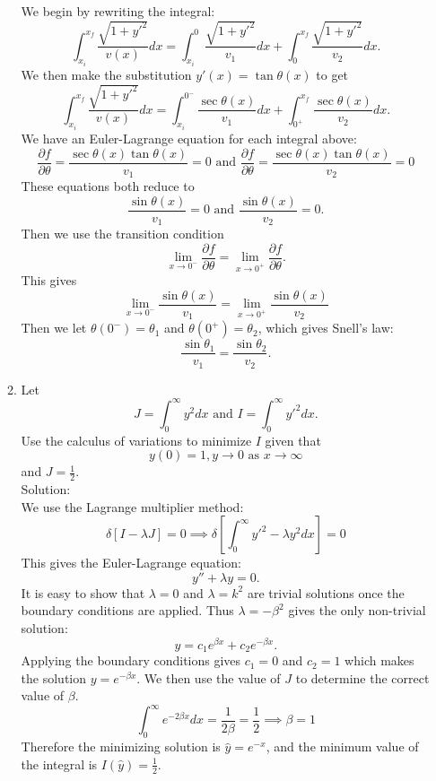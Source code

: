 \documentclass[12pt]{article}
\numberwithin{equation}{section}
\begin{document}
\begin{enumerate}
\begin{enumerate}
We begin by rewriting the integral:
$$\int_{x_i}^{x_f}\frac{\sqrt{1+y'^2}}{v(x)}dx=\int_{x_i}^{0}\frac{\sqrt{1+y'^2}}{v_1}dx+\int_{0}^{x_f}\frac{\sqrt{1+y'^2}}{v_2}dx.$$
We then make the substitution $y'(x)=\tan\theta(x)$ to get
$$\int_{x_i}^{x_f}\frac{\sqrt{1+y'^2}}{v(x)}dx=\int_{x_i}^{0^-}\frac{\sec\theta(x)}{v_1}dx+\int_{0^+}^{x_f}\frac{\sec\theta(x)}{v_2}dx.$$
We have an Euler-Lagrange equation for each integral above:
$$\frac{\partial f}{\partial \theta}=\frac{\sec\theta(x)\tan\theta(x)}{v_1}=0\text{ and }\frac{\partial f}{\partial \theta} =\frac{\sec\theta(x)\tan\theta(x)}{v_2}=0$$
These equations both reduce to
$$\frac{\sin\theta(x)}{v_1}=0\text{ and }\frac{\sin\theta(x)}{v_2}=0.$$
Then we use the transition condition
$$\lim_{x\to0^-}\frac{\partial f}{\partial \theta}=\lim_{x\to 0^+}\frac{\partial f}{\partial \theta}.$$
This gives
$$\lim_{x\to 0^-}\frac{\sin\theta(x)}{v_1}=\lim_{x\to 0^+}\frac{\sin\theta(x)}{v_2}$$
Then we let $\theta(0^-)=\theta_1$ and $\theta(0^+)=\theta_2$, which gives Snell's law:
$$\frac{\sin\theta_1}{v_1}=\frac{\sin\theta_2}{v_2}.$$

\item Let
$$J=\int_0^\infty y^2dx\text{ and }I=\int_0^\infty y'^2 dx.$$
Use the calculus of variations to minimize $I$ given that
$$y(0)=1, y\to0\text{ as }x\to \infty$$
and $J=\frac{1}{2}$. \\

Solution:\\

We use the Lagrange multiplier method:
$$\delta[I-\lambda J]=0\implies\delta[\int_0^\infty y'^2-\lambda y^2 dx]=0$$
This gives the Euler-Lagrange equation:
$$y''+\lambda y=0.$$
It is easy to show that $\lambda=0$ and $\lambda=k^2$ are trivial solutions once the boundary conditions are applied. Thus $\lambda=-\beta^2$ gives the only non-trivial solution:
$$y=c_1e^{\beta x}+c_2e^{-\beta x}.$$
Applying the boundary conditions gives $c_1=0$ and $c_2=1$ which makes the solution $y=e^{-\beta x}$. We then use the value of $J$ to determine the correct value of $\beta$.
$$\int_0^\infty e^{-2\beta x}dx=\frac{1}{2\beta}=\frac{1}{2}\implies \beta=1$$
Therefore the minimizing solution is $\hat{y}=e^{-x}$, and the minimum value of the integral is $I(\hat{y})=\frac{1}{2}.$
\end{enumerate}
\end{enumerate}
\end{document}
